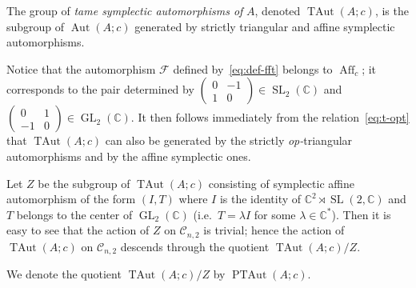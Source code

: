 \documentclass[11pt]{article}
\newcommand{\bb}[1]{\mathbb{#1}}
\newcommand{\smm}[1]{\left(\begin{smallmatrix} #1\end{smallmatrix}\right)}
\DeclareMathOperator{\GL}{GL}
\DeclareMathOperator{\SL}{SL}
\DeclareMathOperator{\Aut}{Aut}
\DeclareMathOperator{\TAut}{TAut}
\DeclareMathOperator{\PTAut}{PTAut}
\DeclareMathOperator{\Aff}{Aff}
\begin{document}
\begin{definition}
\label{def:TAut}
The group of \textit{tame symplectic automorphisms of} \(A\), denoted \(\TAut(A;c)\), is the subgroup of
\(\Aut(A;c)\) generated by strictly triangular and af\/f\/ine symplectic automorphisms.
\end{definition}

Notice that the automorphism \(\mathcal{F}\) def\/ined by~\eqref{eq:def-fft} belongs to \(\Aff_{c}\); it
corresponds to the pair determined by \(\smm{0 & -1
\\
1 & 0}\in \SL_{2}(\bb{C})\) and \(\smm{0 & 1
\\
-1 & 0}\in \GL_{2}(\bb{C})\).
It then follows immediately from the relation~\eqref{eq:t-opt} that \(\TAut(A;c)\) can also be generated by
the strictly \emph{op-}triangular automorphisms and by the af\/f\/ine symplectic ones.

Let \(Z\) be the subgroup of \(\TAut(A;c)\) consisting of symplectic af\/f\/ine automorphism of the form
\((I,T)\) where \(I\) is the identity of \(\bb{C}^{2}\rtimes \SL(2,\bb{C})\) and \(T\) belongs to the
center of \(\GL_{2}(\bb{C})\) (i.e.\
\(T = \lambda I\) for some \(\lambda\in \bb{C}^{*}\)).
Then it is easy to see that the action of \(Z\) on \(\mathcal{C}_{n,2}\) is trivial; hence the action of
\(\TAut(A;c)\) on \(\mathcal{C}_{n,2}\) descends through the quotient \(\TAut(A;c)/Z\).

\begin{definition}
\label{def:PTAut}
We denote the quotient \(\TAut(A;c)/Z\) by \(\PTAut(A;c)\).
\end{definition}
\end{document}
